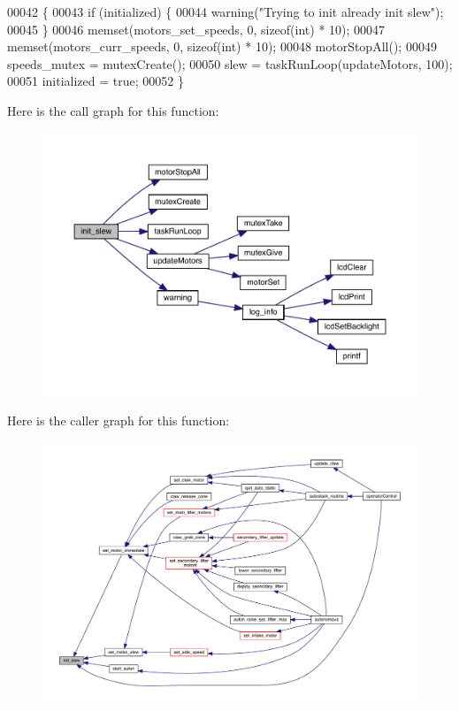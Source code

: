 \begin{DoxyCode}
00042                  \{
00043   \textcolor{keywordflow}{if} (initialized) \{
00044     warning(\textcolor{stringliteral}{"Trying to init already init slew"});
00045   \}
00046   memset(motors_set_speeds, 0, \textcolor{keyword}{sizeof}(\textcolor{keywordtype}{int}) * 10);
00047   memset(motors_curr_speeds, 0, \textcolor{keyword}{sizeof}(\textcolor{keywordtype}{int}) * 10);
00048   motorStopAll();
00049   speeds_mutex = mutexCreate();
00050   slew = taskRunLoop(updateMotors, 100);
00051   initialized = \textcolor{keyword}{true};
00052 \}
\end{DoxyCode}
Here is the call graph for this function\+:
\nopagebreak
\begin{figure}[H]
\begin{center}
\leavevmode
\includegraphics[width=350pt]{slew_8c_a321758941d88b75783955c819bb75005_cgraph}
\end{center}
\end{figure}
Here is the caller graph for this function\+:
\nopagebreak
\begin{figure}[H]
\begin{center}
\leavevmode
\includegraphics[width=350pt]{slew_8c_a321758941d88b75783955c819bb75005_icgraph}
\end{center}
\end{figure}
\mbox{\label{slew_8c_a9f8b8ae577ef938622024545711f0151}} 
